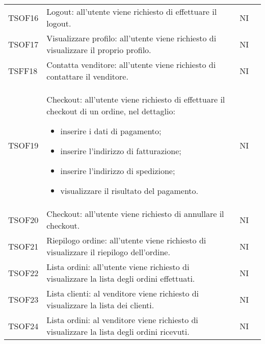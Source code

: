 \begin{center}
\begin{longtable}[!h]{p{50px} p{245px} p{75px} p{50px}}
        TSOF16                           & Logout: all'utente viene richiesto di effettuare il logout.                                                                                                         & NI             \\
        TSOF17                           & Visualizzare profilo: all'utente viene richiesto di visualizzare il proprio profilo.                                                                                & NI             \\
        TSFF18                           & Contatta venditore: all'utente viene richiesto di contattare il venditore.                                                                                          & NI             \\
        TSOF19                           & Checkout: all'utente viene richiesto di effettuare il checkout di un ordine, nel dettaglio: \begin{itemize} \item inserire i dati di pagamento; \item inserire l'indirizzo di fatturazione; \item inserire l'indirizzo di spedizione; \item visualizzare il risultato del pagamento. \end{itemize}                                              & NI             \\
        TSOF20                           & Checkout: all'utente viene richiesto di annullare il checkout.                                                                                                      & NI             \\
        TSOF21                           & Riepilogo ordine: all'utente viene richiesto di visualizzare il riepilogo dell'ordine.                                                                              & NI             \\
        TSOF22                           & Lista ordini: all'utente viene richiesto di visualizzare la lista degli ordini effettuati.                                                                          & NI             \\
        TSOF23                           & Lista clienti: al venditore viene richiesto di visualizzare la lista dei clienti.                                                                                   & NI             \\
        TSOF24                           & Lista ordini: al venditore viene richiesto di visualizzare la lista degli ordini ricevuti.                                                                          & NI             \\

\end{longtable}
\end{center}
